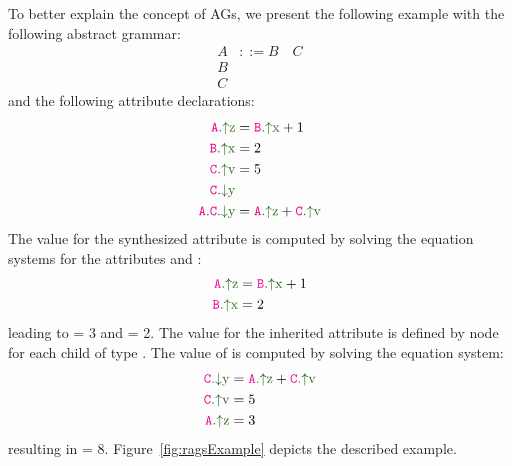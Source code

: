 To better explain the concept of AGs, we present the following
example with the following abstract grammar:
    \begin{align*}
        A& ::= B \quad C \\
        B& \\
        C&
    \end{align*}
and the following attribute declarations:
    \begin{align*}
        \Asyn{A}{z}& = \Asyn{B}{x} + 1 \\
        \Asyn{B}{x}& = 2 \\
        \Asyn{C}{v}& = 5 \\
        \Ainh{C}{y}& \\
        \Ainhdef{A}{C}{y}& = \Asyn{A}{z} + \Asyn{C}{v} \\
    \end{align*}
The value for the synthesized attribute  is computed by solving
the equation systems for the attributes  and :
\begin{align*}
    \Asyn{A}{z} &= \Asyn{B}{x} + 1 \\
    \Asyn{B}{x} &= 2
\end{align*}
leading to  = 3 and  = 2.
The value for the inherited attribute  is defined by node  for
each child of type . The value of  is computed by solving the equation system:
\begin{align*}
    \Ainh{C}{y} &= \Asyn{A}{z} + \Asyn{C}{v} \\
    \Asyn{C}{v} &= 5\\
    \Asyn{A}{z} &= 3
\end{align*}
resulting in  = 8. Figure~\ref{fig:ragsExample} depicts the described example.


